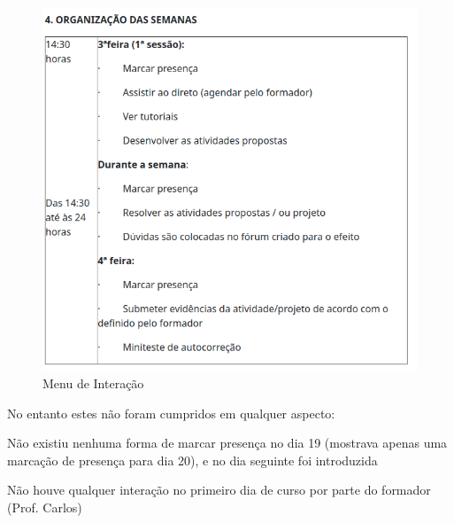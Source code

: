\documentclass[12pt]{article}
\begin{document}
\begin{figure}[h]
        \centering
        \includegraphics[width=0.45\linewidth]{cal.png}
        \caption{Menu de Interação}
        \label{fig:menu1}
\end{figure}


No entanto estes não foram cumpridos em qualquer aspecto:
\begin{list}{•}{•}
\item Não existiu nenhuma forma de marcar presença no dia 19 (mostrava apenas uma marcação de presença para dia 20),
e no dia seguinte foi introduzida

\item Não houve qualquer interação no primeiro dia de curso por parte do formador (Prof. Carlos)
\end{list}
\end{document}
